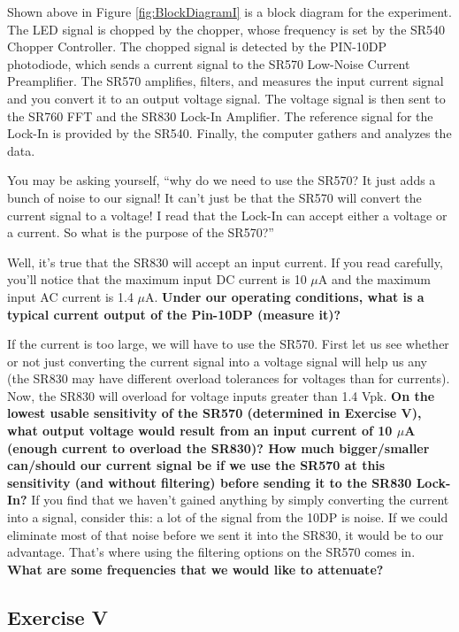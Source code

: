 \documentclass{../lab}
\begin{document}
Shown above in Figure \ref{fig:BlockDiagramI} is a block diagram for the experiment. The LED signal is chopped by the chopper, whose frequency is set by the SR540 Chopper Controller. The chopped signal is detected by the PIN-10DP photodiode, which sends a current signal to the SR570 Low-Noise Current Preamplifier. The SR570 amplifies, filters, and measures the input current signal and you convert it to an output voltage signal. The voltage signal is then sent to the SR760 FFT and the SR830 Lock-In Amplifier. The reference signal for the Lock-In is provided by the SR540. Finally, the computer gathers and analyzes the data.

You may be asking yourself, ``why do we need to use the SR570? It just adds a bunch of noise to our signal! It can't just be that the SR570 will convert the current signal to a voltage! I read that the Lock-In can accept either a voltage or a current. So what is the purpose of the SR570?''

Well, it's true that the SR830 will accept an input current. If you read carefully, you'll notice that the maximum input DC current is 10 $\mu$A and the maximum input AC current is 1.4 $\mu$A. \textbf{Under our operating conditions, what is a typical current output of the Pin-10DP (measure it)?}

If the current is too large, we will have to use the SR570. First let us see whether or not just converting the current signal into a voltage signal will help us any (the SR830 may have different overload tolerances for voltages than for currents). Now, the SR830 will overload for voltage inputs greater than 1.4 Vpk. \textbf{On the lowest usable sensitivity of the SR570 (determined in Exercise V), what output voltage would result from an input current of 10 $\mu$A (enough current to overload the SR830)? How much bigger/smaller can/should our current signal be if we use the SR570 at this sensitivity (and without filtering) before sending it to the SR830 Lock-In?} If you find that we haven't gained anything by simply converting the current into a signal, consider this: a lot of the signal from the 10DP is noise. If we could eliminate most of that noise before we sent it into the SR830, it would be to our advantage. That's where using the filtering options on the SR570 comes in. \textbf{What are some frequencies that we would like to attenuate?}

\subsection{Exercise V}
\end{document}
